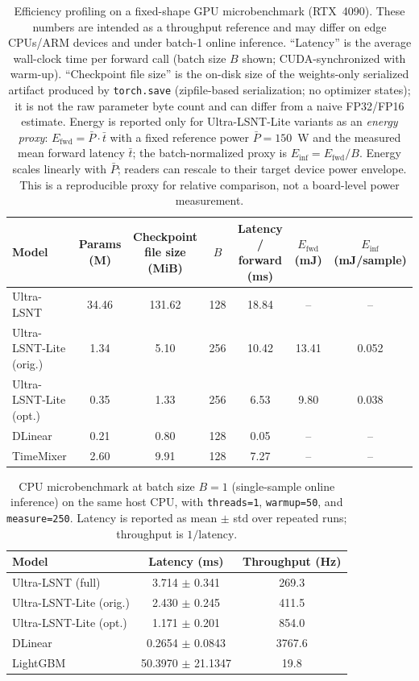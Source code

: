 \documentclass[review,3p,times]{elsarticle}
\begin{document}
\begin{table}[t]
\centering
\caption{Efficiency profiling on a fixed-shape GPU microbenchmark (RTX~4090). These numbers are intended as a throughput reference and may differ on edge CPUs/ARM devices and under batch-1 online inference. ``Latency'' is the average wall-clock time per forward call (batch size $B$ shown; CUDA-synchronized with warm-up). ``Checkpoint file size'' is the on-disk size of the weights-only serialized artifact produced by \texttt{torch.save} (zipfile-based serialization; no optimizer states); it is not the raw parameter byte count and can differ from a naive FP32/FP16 estimate. Energy is reported only for Ultra-LSNT-Lite variants as an \emph{energy proxy}: $E_{\text{fwd}}=\bar{P}\cdot\bar{t}$ with a fixed reference power $\bar{P}=150$~W and the measured mean forward latency $\bar{t}$; the batch-normalized proxy is $E_{\text{inf}}=E_{\text{fwd}}/B$. Energy scales linearly with $\bar{P}$; readers can rescale to their target device power envelope. This is a reproducible proxy for relative comparison, not a board-level power measurement.}
\label{tab:efficiency}
\begin{tabular}{lcccccc}
\toprule
Model & Params (M) & Checkpoint file size (MiB) & $B$ & Latency / forward (ms) & $E_{\text{fwd}}$ (mJ) & $E_{\text{inf}}$ (mJ/sample) \\
\midrule
Ultra-LSNT & 34.46 & 131.62 & 128 & 18.84 & -- & -- \\
Ultra-LSNT-Lite (orig.) & 1.34 & 5.10 & 256 & 10.42 & 13.41 & 0.052 \\
Ultra-LSNT-Lite (opt.) & 0.35 & 1.33 & 256 & 6.53 & 9.80 & 0.038 \\
DLinear & 0.21 & 0.80 & 128 & 0.05 & -- & -- \\
TimeMixer & 2.60 & 9.91 & 128 & 7.27 & -- & -- \\
\bottomrule
\end{tabular}
\end{table}

\begin{table}[t]
\centering
\caption{CPU microbenchmark at batch size $B=1$ (single-sample online inference) on the same host CPU, with \texttt{threads=1}, \texttt{warmup=50}, and \texttt{measure=250}. Latency is reported as mean $\pm$ std over repeated runs; throughput is $1/\text{latency}$.}
\label{tab:cpu_batch1_latency}
\begin{tabular}{lcc}
\toprule
Model & Latency (ms) & Throughput (Hz) \\
\midrule
Ultra-LSNT (full) & 3.714 $\pm$ 0.341 & 269.3 \\
Ultra-LSNT-Lite (orig.) & 2.430 $\pm$ 0.245 & 411.5 \\
Ultra-LSNT-Lite (opt.) & 1.171 $\pm$ 0.201 & 854.0 \\
DLinear & 0.2654 $\pm$ 0.0843 & 3767.6 \\
LightGBM & 50.3970 $\pm$ 21.1347 & 19.8 \\
\bottomrule
\end{tabular}
\end{table}
\end{document}
